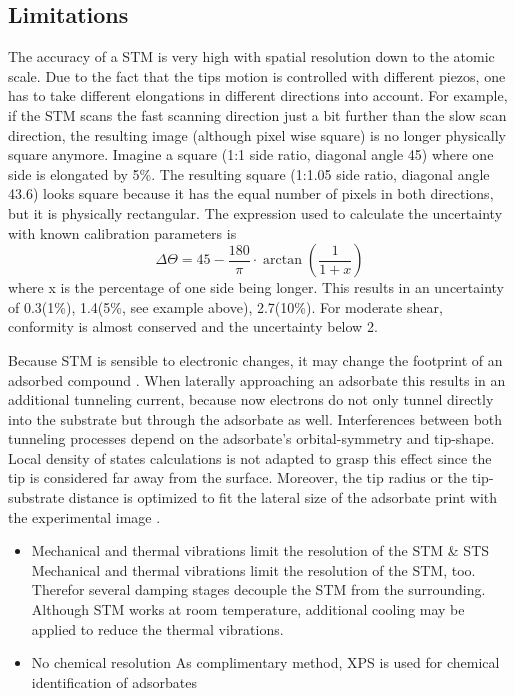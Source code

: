 \subsection{Limitations}The accuracy of a STM is very high with spatial resolution down to the atomic scale. Due to the fact that the tips motion is controlled with different piezos, one has to take different elongations in different directions into account. For example, if the STM scans the fast scanning direction just a bit further than the slow scan direction, the resulting image (although pixel wise square) is no longer physically square anymore. Imagine a square (1:1 side ratio, diagonal angle 45\textdegree) where one side is elongated by 5\%. The resulting square (1:1.05 side ratio, diagonal angle 43.6\textdegree) looks square because it has the equal number of pixels in both directions, but it is physically rectangular. The expression used to calculate the uncertainty with known calibration parameters is
$$\Delta \Theta = 45 - \frac{180}{\pi}\cdot\arctan(\frac{1}{1+x})$$ where x is the percentage of one side being longer. This results in an uncertainty of 0.3\textdegree(1\%), 1.4\textdegree(5\%, see example above), 2.7\textdegree(10\%). For moderate shear, conformity is almost conserved and the uncertainty below 2\textdegree.

Because STM is sensible to electronic changes, it may change the footprint of an adsorbed compound \cite{sautet_interpretation_1992}. When laterally approaching an adsorbate this results in an additional tunneling current, because now electrons do not only tunnel directly into the substrate but through the adsorbate as well. Interferences between both tunneling processes depend on the adsorbate's orbital-symmetry and tip-shape. Local density of states calculations \cite{tersoff_theory_1985, lang_theory_1986, eigler_imaging_1991} is not adapted to grasp this effect since the tip is considered far away from the surface. Moreover, the tip radius or the tip-substrate distance is optimized to fit the lateral size of the adsorbate print with the experimental image \cite{tersoff_theory_1985, eigler_imaging_1991}.

\begin{itemize}
	\item Mechanical and thermal vibrations limit the resolution of the STM \& STS
	Mechanical and thermal vibrations limit the resolution of the STM, too. Therefor several damping stages decouple the STM from the surrounding. Although STM works at room temperature, additional cooling may be applied to reduce the thermal vibrations.
	\item No chemical resolution
	\subitem As complimentary method, XPS is used for chemical identification of adsorbates
\end{itemize}

